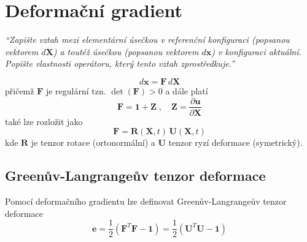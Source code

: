 \documentclass{article}
\begin{document}
	\section{Deformační gradient}
	\emph{``Zapište vztah mezi elementární úsečkou v referenční konfiguraci (popsanou vektorem $d\bm{X}$) a toutéž úsečkou (popsanou vektorem $d\bm{x}$) v konfiguraci aktuální. Popište vlastnosti operátoru, který tento vztah zprostředkuje.''}

	\begin{equation}
		d\bm{x} = \bm{F} \, d\bm{X}
	\end{equation}
	přičemž $\bm{F}$ je regulární tzn. $\det(\bm{F}) > 0$ a dále platí
	\begin{equation}
	\bm{F} = \bm{1} + \bm{Z}
	\;,\quad 
	\bm{Z} = \frac{\partial \bm{u}}{\partial \bm{X}}
	\end{equation}
	také lze rozložit jako
	\begin{equation}
	\bm{F} = \bm{R}(\bm{X},t)\,\bm{U}(\bm{X},t)
	\end{equation}
	kde $\bm{R}$ je tenzor rotace (ortonormální) a $\bm{U}$ tenzor ryzí deformace (symetrický).
	
	\subsection{Greenův-Langrangeův tenzor deformace}
	Pomocí deformačního gradientu lze definovat Greenův-Langrangeův tenzor deformace
	\begin{equation}
	\bm{e} = \frac{1}{2}(\bm{F}^T\bm{F} - \bm{1}) = \frac{1}{2}(\bm{U}^T\bm{U} - \bm{1})
	\end{equation}
\end{document}
